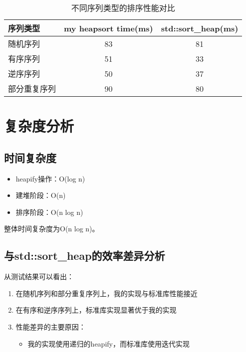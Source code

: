 \documentclass[UTF8]{ctexart}
\begin{document}
\begin{table}[h]
\centering
\begin{tabular}{|l|c|c|}
\hline
序列类型 & my heapsort time(ms) & std::sort\_heap(ms) \\
\hline
随机序列 & 83 & 81 \\
有序序列 & 51 & 33 \\
逆序序列 & 50 & 37 \\
部分重复序列 & 90 & 80 \\
\hline
\end{tabular}
\caption{不同序列类型的排序性能对比}
\end{table}

\section{复杂度分析}

\subsection{时间复杂度}
\begin{itemize}
    \item heapify操作：O(log n)
    \item 建堆阶段：O(n)
    \item 排序阶段：O(n log n)
\end{itemize}

整体时间复杂度为O(n log n)。

\subsection{与std::sort\_heap的效率差异分析}

从测试结果可以看出：
\begin{enumerate}
    \item 在随机序列和部分重复序列上，我的实现与标准库性能接近
    \item 在有序和逆序序列上，标准库实现显著优于我的实现
    \item 性能差异的主要原因：
        \begin{itemize}
            \item 我的实现使用递归的heapify，而标准库使用迭代实现
        \end{itemize}
\end{enumerate}
\end{document}
